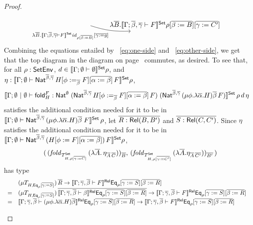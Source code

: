 \documentclass[acmsmall,review,anonymous]{acmart}
\theoremstyle{definition}
\renewcommand{\id}{\mathit{id}}
\begin{document}
\begin{proof}
\begin{itemize}
{\begin{equation}
\begin{tikzcd}[row sep = huge]
\ar[r, bend right = 10, "{\lambda \ol{B}.\oCPOsem{\Gamma; \ol{\beta}, \ol{\gamma}
      \vdash F} \id_{\rho [\ol{\beta := B}]} [\ol{\gamma := g}]}"'] &
\lambda \ol{B}.\oCPOsem{\Gamma; \ol{\beta}, \ol{\gamma} \vdash F} \rho [\ol{\beta :=
    B}] [\ol{\gamma := C'}]
\end{tikzcd}
\end{equation}}
Combining the equations entailed by ~\eqref{eq:one-side}
and ~\eqref{eq:other-side}, we get that
the top diagram in the diagram on
  page~\pageref{page:dia1} commutes, as desired.
To see that, for all $\rho : \mathsf{SetEnv}$, $d \in
\llbracket{\Gamma; \emptyset \vdash \emptyset}\rrbracket^{\mathsf{Set}}\rho$, and $\eta :
\llbracket{\Gamma; \emptyset \vdash \mathsf{Nat}^{\overline{\beta},
    \overline{\gamma}}\,H[\phi :=_{\overline{\beta}} F][\overline{\alpha := \beta}]\,F}\rrbracket^{\mathsf{Set}}
\rho$,
\[\llbracket{\Gamma; \emptyset~|~\emptyset
  \vdash \mathsf{fold}^F_H : \mathsf{Nat}^\emptyset\;(\mathsf{Nat}^{\overline{\beta},
    \overline{\gamma}}\,H[\phi :=_{\overline{\beta}} F][\overline{\alpha :=
      \beta}]\,F)\; (\mathsf{Nat}^{{\overline{\beta},\overline{\gamma}} }\,(\mu
  \phi.\lambda \overline \alpha.H)\overline \beta\,F)}\rrbracket^{\mathsf{Set}}\,\rho\,d\,\eta\]
satisfies the additional condition needed for it to be in
$\llbracket{\Gamma;\emptyset \vdash \mathsf{Nat}^{{\overline{\beta},\overline{\gamma}}
  }\,(\mu \phi.\lambda \overline \alpha.H)\overline \beta\;F}\rrbracket^{\mathsf{Set}}\,\rho$,
let $\overline{R : {\mathsf{Rel}}(B,B')}$ and $\overline{S : {\mathsf{Rel}}(C,C')}$.  Since $\eta$
satisfies the additional condition needed for it to be in
$\llbracket{\Gamma; \emptyset \vdash \mathsf{Nat}^{\overline{\beta},
    \overline{\gamma}}\,(H[\phi := F][\overline{\alpha := \beta}])\,F}\rrbracket^{\mathsf{Set}} \rho$,
\[\begin{array}{ll}
 & (\,(\mathit{fold}_{T^{\mathsf{Set}}_{H,\rho[\overline{\gamma :=
        C}]}}\,(\lambda \overline{A}.\,\eta_{\overline{A}\,\overline{C}}))_{\overline{B}},\,
(\mathit{fold}_{T^{\mathsf{Set}}_{H,\rho[\overline{\gamma :=
        C'}]}}\,(\lambda \overline{A}.\eta_{\overline{A}\,\overline{C'}}))_{\overline{B'}}\,) 
\end{array}\]
has type
\[\begin{array}{ll}
  & (\mu T_{H,\mathsf{Eq}_\rho[\overline{\gamma := S}]}) \,\overline{R} \to
\llbracket{\Gamma;\overline{\gamma},\overline{\beta} \vdash F}\rrbracket^{\mathsf{Rel}}\mathsf{Eq}_\rho[\overline{\gamma := 
    S}][\overline{\beta:= R}]\\ 
= & (\mu T_{H,\mathsf{Eq}_\rho[\overline{\gamma :=
      S}]})\,\overline{\llbracket{\Gamma;\overline{\gamma},\overline{\beta} 
  \vdash \beta}\rrbracket^{\mathsf{Rel}}\mathsf{Eq}_\rho[\overline{\gamma := S}][\overline{\beta := R}]} \to
\llbracket{\Gamma;\overline{\gamma},\overline{\beta} \vdash F}\rrbracket^{\mathsf{Rel}}\mathsf{Eq}_\rho[\overline{\gamma := 
    S}][\overline{\beta:= R}]\\ 
= & \llbracket{\Gamma; \overline{\gamma},\overline{\beta} \vdash (\mu \phi. \lambda
  \overline{\alpha}. H)\overline{\beta}}\rrbracket^{\mathsf{Rel}}\mathsf{Eq}_\rho[\overline{\gamma := S}][\overline{\beta := R}] \to
\llbracket{\Gamma;\overline{\gamma},\overline{\beta} \vdash F}\rrbracket^{\mathsf{Rel}}\mathsf{Eq}_\rho[\overline{\gamma := 
    S}][\overline{\beta:= R}]
\qedhere
\end{array}\]


\end{itemize}
\end{proof}
\end{document}
